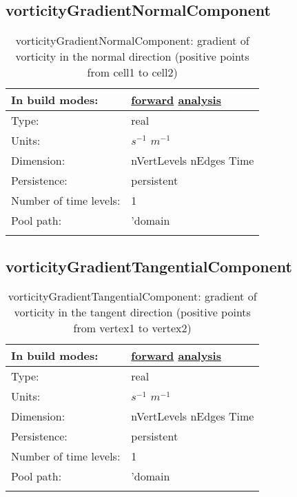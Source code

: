 \subsection[vorticityGradientNormalComponent]{vorticityGradientNormalComponent}
\label{subsec:var_sec_scratch_vorticityGradientNormalComponent}
\begin{center}
\begin{longtable}{| p{2.0in} | p{4.0in} |}
        \hline 
        In build modes: & \hyperref[subsec:forward_var_tab_scratch]{forward} \hyperref[subsec:analysis_var_tab_scratch]{analysis} \\
        \hline 
        Type: & real \\
        \hline 
        Units: & $s^{-1}$ $m^{-1}$ \\
        \hline 
        Dimension: & nVertLevels nEdges Time \\
        \hline 
        Persistence: & persistent \\
        \hline 
        Number of time levels: & 1 \\
        \hline 
            Pool path: & 'domain %
 \\
		 \hline 
    \caption{vorticityGradientNormalComponent: gradient of vorticity in the normal direction (positive points from cell1 to cell2)}
\end{longtable}
\end{center}
\subsection[vorticityGradientTangentialComponent]{vorticityGradientTangentialComponent}
\label{subsec:var_sec_scratch_vorticityGradientTangentialComponent}
\begin{center}
\begin{longtable}{| p{2.0in} | p{4.0in} |}
        \hline 
        In build modes: & \hyperref[subsec:forward_var_tab_scratch]{forward} \hyperref[subsec:analysis_var_tab_scratch]{analysis} \\
        \hline 
        Type: & real \\
        \hline 
        Units: & $s^{-1}$ $m^{-1}$ \\
        \hline 
        Dimension: & nVertLevels nEdges Time \\
        \hline 
        Persistence: & persistent \\
        \hline 
        Number of time levels: & 1 \\
        \hline 
            Pool path: & 'domain %
 \\
		 \hline 
    \caption{vorticityGradientTangentialComponent: gradient of vorticity in the tangent direction (positive points from vertex1 to vertex2)}
\end{longtable}
\end{center}

